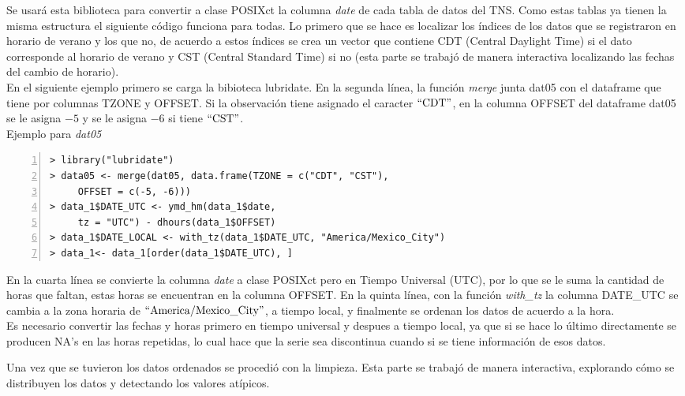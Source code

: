 Se usará esta biblioteca  para convertir a clase POSIXct la columna \emph{date} de cada tabla de datos del TNS. Como estas tablas ya tienen la misma estructura el siguiente código funciona para todas. Lo primero que se hace es localizar los índices de los datos que se registraron en horario de verano y los que no, de acuerdo a estos índices se crea un vector que contiene  CDT (Central Daylight Time) si el dato corresponde al horario de verano y  CST (Central Standard Time) si no (esta parte se trabajó de manera interactiva localizando las fechas del cambio de horario).\\ 

En el siguiente ejemplo primero se carga la bibioteca lubridate. En la segunda línea, la función \emph{merge} junta dat05 con el dataframe que tiene por columnas TZONE y OFFSET. Si la observación tiene asignado el caracter $\mathrm{``CDT"}$, en la columna OFFSET del dataframe dat05 se le asigna $-5$ y se le asigna $-6$ si tiene $\mathrm{``CST"}$.\\

Ejemplo para \emph{dat05}
\begin{mybox}
\begin{Verbatim}[numbers=left,xleftmargin=5mm]
> library("lubridate")
> data05 <- merge(dat05, data.frame(TZONE = c("CDT", "CST"), 
 	 OFFSET = c(-5, -6)))
> data_1$DATE_UTC <- ymd_hm(data_1$date, 
	 tz = "UTC") - dhours(data_1$OFFSET)
> data_1$DATE_LOCAL <- with_tz(data_1$DATE_UTC, "America/Mexico_City")
> data_1<- data_1[order(data_1$DATE_UTC), ]
\end{Verbatim}
\end{mybox}

En la cuarta línea se convierte la columna \emph{date} a clase POSIXct pero en Tiempo Universal (UTC), por lo que se le suma la cantidad de horas que faltan, estas horas se encuentran en la columna OFFSET. En la quinta línea, con la función  \emph{with\_tz} la columna DATE\_UTC se cambia a la zona horaria de $\mathrm{``America/Mexico\_City"}$, a tiempo local, y finalmente se ordenan los datos de acuerdo a la hora.\\

Es necesario convertir las fechas y horas primero en tiempo universal y despues a tiempo local, ya que si se hace lo último directamente se producen NA's en las horas repetidas, lo cual hace que la serie sea discontinua cuando si se tiene información de esos datos.

Una vez que se tuvieron los datos ordenados se procedió con la limpieza. Esta parte se trabajó de manera interactiva, explorando cómo se distribuyen los datos y detectando los valores atípicos.\\

